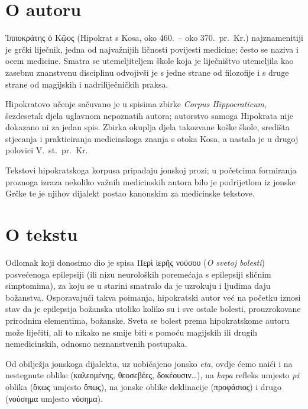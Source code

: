 \section*{O autoru}

Ἱπποκράτης ὁ Κῷος (Hipokrat s Kosa, oko 460.\ – oko 370.\ pr.~Kr.) najznamenitiji je grčki liječnik, jedna od najvažnijih ličnosti povijesti medicine; često se naziva i ocem medicine. Smatra se utemeljiteljem škole koja je liječništvo utemeljila kao zasebnu znanstvenu disciplinu odvojivši je s jedne strane od filozofije i s druge strane od magijskih i nadriliječničkih praksa. 

Hipokratovo učenje sačuvano je u spisima zbirke \textit{Corpus Hippocraticum}, šezdesetak djela uglavnom nepoznatih autora; autorstvo samoga Hipokrata nije dokazano ni za jedan spis. Zbirka okuplja djela takozvane koške škole, središta stjecanja i prakticiranja medicinskoga znanja s otoka Kosa, a nastala je u drugoj polovici V.~st.\ pr.~Kr.

Tekstovi hipokratskoga korpusa pripadaju jonskoj prozi; u početcima formiranja proznoga izraza nekoliko važnih medicinskih autora bilo je podrijetlom iz jonske Grčke te je njihov dijalekt postao kanonskim za medicinske tekstove. 

\section*{O tekstu}

Odlomak koji donosimo dio je spisa \textgreek[variant=ancient]{Περὶ ἱερῆς νούσου} (\textit{O svetoj bolesti}) posvećenoga epilepsiji (ili nizu neuroloških poremećaja s epilepsiji sličnim simptomima), za koju se u starini smatralo da je uzrokuju i ljudima daju božanstva. Osporavajući takva poimanja, hipokratski autor već na početku iznosi stav da je epilepsija božanska utoliko koliko su i sve ostale bolesti, prouzrokovane prirodnim elementima, božanske. Sveta se bolest prema hipokratskome autoru može liječiti, ali to nikako ne smije biti s pomoću magijskih ili drugih nemedicinskih, odnosno neznanstvenih postupaka.

Od obilježja jonskoga dijalekta, uz uobičajeno jonsko \textit{eta}, ovdje ćemo naići i na nestegnute oblike \textgreek[variant=ancient]{(καλεομένης, θεοσεβέες, δοκέουσιν\dots)}, na \textit{kapa} refleks umjesto \textit{pi} oblika \textgreek[variant=ancient]{(ὅκως} umjesto \textgreek[variant=ancient]{ὅπως),} na jonske oblike deklinacije \textgreek[variant=ancient]{(προφάσιος)} i drugo \textgreek[variant=ancient]{(νούσημα} umjesto \textgreek[variant=ancient]{νόσημα).}

